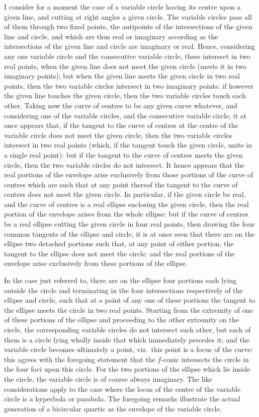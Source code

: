 \documentclass[11pt,a4paper]{book}
\begin{document}
I consider for a moment the case of a variable circle having its centre upon a given line, and cutting at right angles a given circle. The variable circles pass all of them through two fixed points, the antipoints of the intersections of the given line and circle, and which are thus real or imaginary according as the intersections of the given line and circle are imaginary or real. Hence, considering any one variable circle and the consecutive variable circle, these intersect in two real points, when the given line does not meet the given circle (meets it in two imaginary points); but when the given line meets the given circle in two real points, then the two variable circles intersect in two imaginary points: if however the given line touches the given circle, then the two variable circles touch each other. Taking now the curve of centres to be any given curve whatever, and considering one of the variable circles, and the consecutive variable circle, it at once appears that, if the tangent to the curve of centres at the centre of the variable circle does not meet the given circle, then the two variable circles intersect in two real points (which, if the tangent touch the given circle, unite in a single real point): but if the tangent to the curve of centres meets the given circle, then the two variable circles do not intersect. It hence appears that the real portions of the envelope arise exclusively from those portions of the curve of centres which are such that at any point thereof the tangent to the curve of centres does not meet the given circle. In particular, if the given circle be real, and the curve of centres is a real ellipse enclosing the given circle, then the real portion of the envelope arises from the whole ellipse: but if the curve of centres be a real ellipse cutting the given circle in four real points, then drawing the four common tangents of the ellipse and circle, it is at once seen that there are on the ellipse two detached portions such that, at any point of either portion, the tangent to the ellipse does not meet the circle: and the real portions of the envelope arise exclusively from these portions of the ellipse.

In the case just referred to, there are on the ellipse four portions each lying outside the circle and terminating in the four intersections respectively of the ellipse and circle, such that at a point of any one of these portions the tangent to the ellipse meets the circle in two real points. Starting from the extremity of one of these portions of the ellipse and proceeding to the other extremity on the circle, the corresponding variable circles do not intersect each other, but each of them is a circle lying wholly inside that which immediately precedes it; and the variable circle becomes ultimately a point, viz.\ this point is a focus of the curve: this agrees with the foregoing statement that the $f$-conic intersects the circle in the four foci upon this circle. For the two portions of the ellipse which lie inside the circle, the variable circle is of course always imaginary. The like considerations apply to the case where the locus of the centre of the variable circle is a hyperbola or parabola. The foregoing remarks illustrate the actual generation of a bicircular quartic as the envelope of the variable circle.
\end{document}
